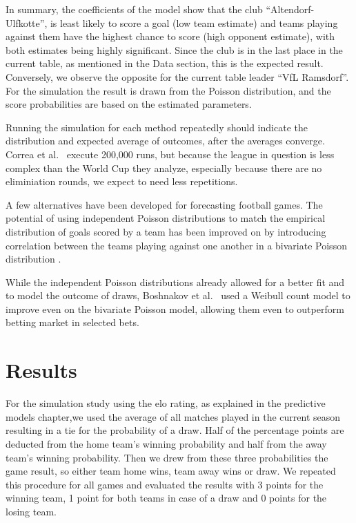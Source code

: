 \documentclass[12pt,a4paper]{article}
\begin{document}
In summary, the coefficients of the model show that the club
\enquote{Altendorf-Ulfkotte}, is least likely to score a goal (low team
estimate) and teams playing against them have the highest chance to
score (high opponent estimate), with both estimates being highly
significant. Since the club is in the last place in the current table,
as mentioned in the Data section, this is the expected result.
Conversely, we observe the opposite for the current table leader
\enquote{VfL Ramsdorf}. For the simulation the result is drawn from the
Poisson distribution, and the score probabilities are based on the
estimated parameters.

Running the simulation for each method repeatedly should indicate the
distribution and expected average of outcomes, after the averages
converge. Correa et al.~\autocite*{correa} execute 200,000 runs, but
because the league in question is less complex than the World Cup they
analyze, especially because there are no eliminiation rounds, we expect
to need less repetitions.

A few alternatives have been developed for forecasting football games.
The potential of using independent Poisson distributions to match the
empirical distribution of goals scored by a team has been improved on by
introducing correlation between the teams playing against one another in
a bivariate Poisson distribution \textcite{karlis2003}.

While the independent Poisson distributions already allowed for a better
fit and to model the outcome of draws, Boshnakov et
al.~\autocite*{boshnakov2016} used a Weibull count model to improve even
on the bivariate Poisson model, allowing them even to outperform betting
market in selected bets.

\hypertarget{results}{%
\section{Results}\label{results}}

For the simulation study using the elo rating, as explained in the
predictive models chapter,we used the average of all matches played in
the current season resulting in a tie for the probability of a draw.
Half of the percentage points are deducted from the home team's winning
probability and half from the away team's winning probability. Then we
drew from these three probabilities the game result, so either team home
wins, team away wins or draw. We repeated this procedure for all games
and evaluated the results with 3 points for the winning team, 1 point
for both teams in case of a draw and 0 points for the losing team.
\end{document}
